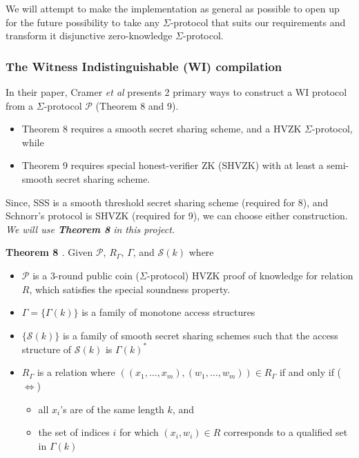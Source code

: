 We will attempt to make the implementation as general as possible to open up for the future possibility to take any $\Sigma$-protocol that suits our requirements and transform it disjunctive zero-knowledge $\Sigma$-protocol.

\subsubsection{The Witness Indistinguishable (WI) compilation}

In their paper, Cramer {\em{et al}} \cite{CDS94} presents 2 primary ways to construct a WI protocol from a $\Sigma$-protocol $\mathcal P$ (Theorem 8 and 9). 

\begin{itemize}
    \item Theorem 8 requires a smooth secret sharing scheme, and a HVZK $\Sigma$-protocol, while
    \item Theorem 9 requires special honest-verifier ZK (SHVZK) with at least a semi-smooth secret sharing scheme.
\end{itemize}

Since, SSS is a smooth threshold secret sharing scheme (required for 8), and Schnorr's protocol is SHVZK (required for 9), we can choose either construction. 
\textit{We will use \textbf{Theorem 8} in this project.}

\textbf{Theorem 8 \cite{CDS94}}. Given $\mathcal P$, $R_\Gamma$, $\Gamma$, and $\mathcal S(k)$ where

\begin{itemize}
    \item $\mathcal P$ is a 3-round public coin ($\Sigma$-protocol) HVZK proof of knowledge for relation $R$, which satisfies the special soundness property.
    \item $\Gamma = \{ \Gamma(k) \}$ is a family of monotone access structures
    \item $\{\mathcal S(k)\}$ is a family of smooth secret sharing schemes such that the access structure of $\mathcal S(k)$ is $\Gamma(k)^*$
    \item $R_\Gamma$ is a relation where $((x_1,\ldots,x_m),(w_1,\ldots,w_m)) \in R_\Gamma$ if and only if ($\iff$)
    \begin{itemize}
        \item all $x_i$'s are of the same length $k$, and 
        \item the set of indices $i$ for which $(x_i,w_i) \in R$ corresponds to a qualified set in $\Gamma(k)$
    \end{itemize}
\end{itemize}

